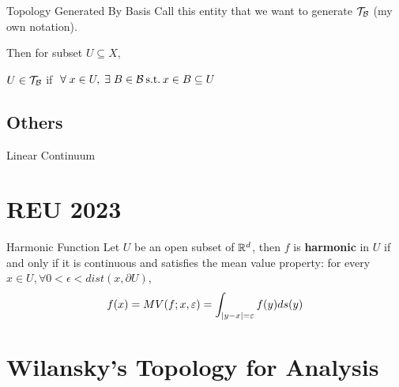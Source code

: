 \documentclass[a4paper, 10pt]{article}
\begin{document}
\begin{definition} {Topology Generated By Basis}
    Call this entity that we want to generate \(\mathcal{T}_{\mathcal{B}}\) (my own notation).

    Then for subset \(U \subseteq X\),
    \begin{center}
        \( U \in \mathcal{T}_{\mathcal{B}}\) if \(\forall x \in U, \exists B \in \calb \st x \in B \subseteq U\)
    \end{center}
\end{definition}

\subsection{Others}
\begin{definition} {Linear Continuum}

\end{definition}


\section{REU 2023}
\begin{definition} {Harmonic Function}
    Let \(U\) be an open subset of \(\mathbb{R}^d\), then \(f\) is \textbf{harmonic} in \(U\) if and only if it is continuous and satisfies the mean value property: for every \(x \in U, \forall 0 < \epsilon < dist(x, \partial U)\),
    \[
        f(x) = MV(f; x, \varepsilon) = \int_{\lvert y-x\rvert = \varepsilon} f(y) ds(y)
    \]
\end{definition}


\section{Wilansky's Topology for Analysis}
\end{document}
